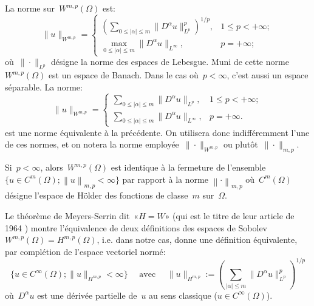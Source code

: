 \medskip
La norme sur~$W^{m,p}(\Omega)$ est:
\begin{equation}
\| u \|_{W^{m, p}} = \begin{cases} \left( \sum \limits_{0\leqslant | \alpha | \leqslant m} \| D^{\alpha} u \|_{L^{p}}^{p} \right)^{1/p}, & 1 \leqslant p < + \infty; \\ \max\limits _{0\leqslant | \alpha | \leqslant m} \| D^{\alpha} u \|_{L^{\infty}}, & p = + \infty; \end{cases}
\end{equation}
où~$\|\cdot\|_{L^{p}}$ désigne la norme des espaces de Lebesgue.
Muni de cette norme~$W^{m,p}(\Omega)$ est un espace de Banach.
Dans le cas où~$p<\infty$, c'est aussi un espace séparable.
\medskipvm
La norme:
\begin{equation}
\| u \|_{W^{m, p}} = 
   \begin{cases} 
   \sum\limits _{0\leqslant | \alpha | \leqslant m} \| D^{\alpha} u \|_{L^{p}}, & 1 \leqslant p < + \infty; \\ \sum\limits _{0 \leqslant | \alpha | \leqslant m} \| D^{\alpha} u \|_{L^{\infty}}, & p = + \infty. 
   \end{cases}
\end{equation}
est une norme équivalente à la précédente. On utilisera donc indifféremment l'une de ces normes, et on notera la norme employée~$\|\cdot\|_{W^{m, p}}$ ou plutôt~$\|\cdot\|_{m, p}$.

\medskip{}
Si~$p<\infty$, alors~$W^{m,p}(\Omega)$ est identique à la fermeture de l'ensemble $\lbrace u \in C^m(\Omega) ; \left\|u \right\|_{m,p} < \infty \rbrace$ par rapport à la norme $\left\|\cdot\right\|_{m,p}$ où~$C^m(\Omega)$ désigne l'espace de Hölder des fonctions de
classe~$m$ sur~$\Omega$.
\medskipvm
\begin{remarque}
Le théorème de Meyers-Serrin dit~«$H=W$» (qui est le titre de leur article de 1964 \cite{bib-WH}) montre l'équivalence de deux définitions des espaces de Sobolev~$W^{m,p}(\Omega) = H^{m,p}(\Omega)$, i.e. dans notre cas, donne une définition équivalente, par complétion de l'espace vectoriel normé:
\begin{equation}
\{u\in C^\infty(\Omega);\| u \|_{H^{m, p}} < \infty\}\quad\text{ avec }\quad
\| u \|_{H^{m, p}}:= \left( \sum_{| \alpha | \leqslant m} \| D^{\alpha} u \|_{L^{p}}^p \right)^{1/p}
\end{equation}
où~$D^\alpha u$ est une dérivée partielle de~$u$ au sens classique ($u \in C^\infty(\Omega)$).
\end{remarque}


